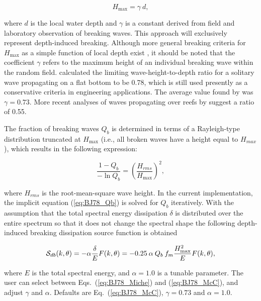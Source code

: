 
\begin{equation}
H_{\max} = \gamma \: d  , \label{eq:BJ78_McC}
\end{equation}

\noindent
where $d$ is the local water depth and $\gamma$ is a constant derived from
field and laboratory observation of breaking waves. This approach will
exclusively represent depth-induced breaking.  Although more general breaking
criteria for $H_{\max}$ as a simple function of local depth exist
\citep[e.g.,][]{art:TG83}, it should be noted that the coefficient $\gamma$
refers to the maximum height of an individual breaking wave within the random
field. \cite{art:M1894} calculated the limiting wave-height-to-depth ratio for
a solitary wave propagating on a flat bottom to be 0.78, which is still used
presently as a conservative criteria in engineering applications. The average
value found by \cite{pro:BJ78} was $\gamma = 0.73$. More recent analyses of
waves propagating over reefs by \cite{art:Nel94, art:Nel97} suggest a ratio of
0.55.

The fraction of breaking waves $Q_b$ is determined in terms of a Rayleigh-type
distribution truncated at $H_{\max}$ (i.e., all broken waves have a height
equal to $H_{max}$), which results in the following expression:


\begin{equation}
\frac{1 - Q_b}{-\ln Q_b} = \left ( \frac{H_{rms}}{H_{\max}} \right ) ^{2}
 , \label{eq:BJ78_Qb}
\end{equation}

\noindent
where $H_{rms}$ is the root-mean-square wave height. In the current
implementation, the implicit equation (\ref{eq:BJ78_Qb}) is solved for $Q_b$
iteratively. With the assumption that the total spectral energy dissipation
$\delta$ is distributed over the entire spectrum so that it does not change
the spectral shape \citep{art:EB96} the following depth-induced breaking
dissipation source function is obtained


\begin{equation}
\cS_{db} (k,\theta) = - \alpha \frac{\delta}{E} F(k,\theta)
       = - 0.25 \: \alpha \: Q_b \: f_m \frac{H_{\max}^2}{E} F(k,\theta)
 , \label{eq:BJ78}
\end{equation}

\noindent
where $E$ is the total spectral energy, and $\alpha = 1.0$ is a tunable
parameter. The user can select between Eqs.~(\ref{eq:BJ78_Miche}) and
(\ref{eq:BJ78_McC}), and adjust $\gamma$ and $\alpha$. Defaults are
Eq.~(\ref{eq:BJ78_McC}), $\gamma = 0.73$ and $\alpha = 1.0$.
